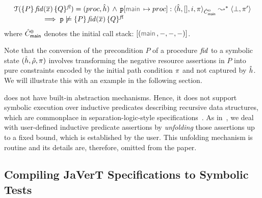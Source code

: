 \begin{theorem}\label{teo:bug:finding:sl}
$$
\begin{array}{l}
\testify{}(\specsig{P}{\fid(\jvec{x})}{Q}{\flag})  = (\proc, \sheap) \, \wedge \, 
   \prog[\jsilmain \mapsto \proc] : \symbtranstranserr{\sheap, [], i, \pc}{\sctxmain}{\pc'} \\
  \qquad \qquad \implies
        \prog \not\satisfies \specsig{P}{\fid(\jvec{x})}{Q}{\flag}
\end{array}
$$
\noindent where $\hat{C}_{\sf main}^0$ denotes the initial call stack: $[ (\jsilmain, -, -, -) ]$.
\end{theorem}


Note that the conversion of the 
precondition $P$ of a \jsil procedure $\mathit{fid}$ to a symbolic state $(\hat{h}, \hat\rho, \pi)$ involves transforming the negative resource assertions in $P$ into pure constraints encoded by the initial path condition $\pi$ and not captured by $\hat{h}$.
We will illustrate this with an example in the following section. 

\jilette does not have built-in abstraction mechanisms. Hence, it does not support symbolic
execution over inductive predicates describing recursive data structures, which are 
commonplace in separation-logic-style specifications~\cite{smallf, berdine:aplas:2005}. 
As in~\cite{korat}, we deal with user-defined inductive predicate assertions by \emph{unfolding} 
those assertions up to a fixed bound, which is established by the user. This unfolding mechanism 
is routine
and its details are, therefore, omitted from the paper. 


\subsection{Compiling JaVerT Specifications to Symbolic Tests} 
\label{specs:example}

